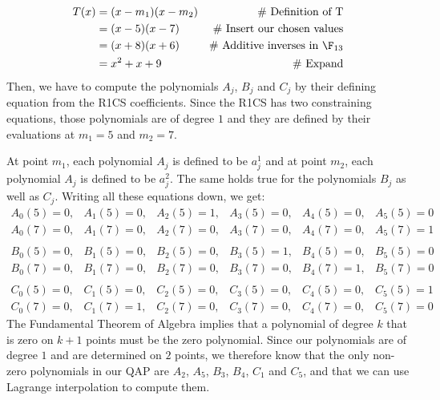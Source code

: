 \begin{example}[3-factorization]
\begin{align*}
T(x) & = (x-m_1)(x-m_2) & \text{\# Definition of T}\\
     & = (x-5)(x-7)  & \text{\# Insert our chosen values}\\
     & = (x+8)(x+6)  & \text{\# Additive inverses in } \F_{13}\\
     & = x^2 + x +9 & \text{\# Expand}
\end{align*}
Then, we have to compute the polynomials $A_j$, $B_j$ and $C_j$ by their defining equation from the R1CS coefficients. Since the R1CS has two constraining equations, those polynomials are of degree $1$ and they are defined by their evaluations at $m_1=5$ and $m_2=7$. 

At point $m_1$, each polynomial $A_j$ is defined to be $a_j^1$ and at point $m_2$, each polynomial $A_j$ is defined to be $a_j^2$. The same holds true for the polynomials $B_j$ as well as $C_j$. Writing all these equations down, we get:
$$
\begin{array}{llllll}
A_0(5)=0, & A_1(5)=0, & A_2(5)=1, & A_3(5)=0, & A_4(5)=0, & A_5(5)=0 \\
A_0(7)=0, & A_1(7)=0, & A_2(7)=0, & A_3(7)=0, & A_4(7)=0, & A_5(7)=1\\
\\
B_0(5)=0, & B_1(5)=0, & B_2(5)=0, & B_3(5)=1, & B_4(5)=0, & B_5(5)=0 \\
B_0(7)=0, & B_1(7)=0, & B_2(7)=0, & B_3(7)=0, & B_4(7)=1, & B_5(7)=0\\
\\
C_0(5)=0, & C_1(5)=0, & C_2(5)=0, & C_3(5)=0, & C_4(5)=0, & C_5(5)=1 \\
C_0(7)=0, & C_1(7)=1, & C_2(7)=0, & C_3(7)=0, & C_4(7)=0, & C_5(7)=0
\end{array}
$$
The Fundamental Theorem of Algebra implies that a polynomial of degree $k$ that is zero on $k+1$ points must be the zero polynomial. Since our polynomials are of degree $1$ and are determined on $2$ points, we therefore know that the only non-zero polynomials in our QAP are $A_2$, $A_5$, $B_3$, $B_4$, $C_1$ and $C_5$, and that we can use Lagrange interpolation to compute them. 


\end{example}
